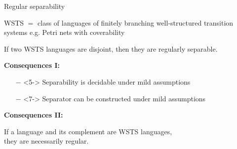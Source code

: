 \documentclass[../talk.tex]{subfiles}
\begin{document}
\begin{frame}{Regular separability}
    \begin{overlayarea}{\slidewidth}{\slideheight}
        WSTS $=$ class of languages of finitely branching well-structured transition systems
        {%
            e.g. Petri nets with coverability
        }

        {%
            \begin{theorem}
                If two WSTS languages are \alert{disjoint}, then they are \alert{regularly separable}.
            \end{theorem}
        }
        {%
            \textbf{Consequences I:}

            \begin{itemize}
                \item[$-$]<5-> Separability is \alert{decidable} under mild assumptions\\
                \item[$-$]<7-> Separator can be \alert{constructed} under mild assumptions
            \end{itemize}
        }

        {%
            \textbf{Consequences II:}

            {%
                \begin{corollary}
                    If a language and its complement are WSTS languages,\\
                    they are \alert{necessarily regular}.
                \end{corollary}
            }

            {%
                \vspace*{-2em}
                \begin{center}
                \end{center}
            }

}
\end{overlayarea}
\end{frame}
\end{document}
